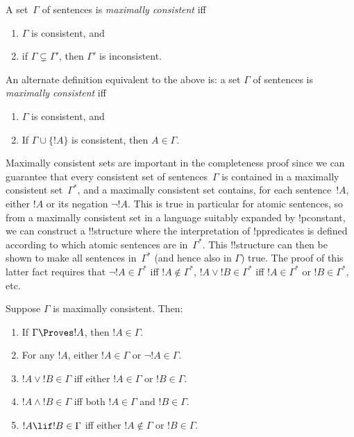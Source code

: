 \documentclass[../../include/open-logic-section]{subfiles}
\begin{document}

\begin{defn}
A set~$\Gamma$ of sentences is \emph{maximally consistent} iff
\begin{enumerate}
\item $\Gamma$ is consistent, and
\item if $\Gamma \subsetneq \Gamma'$, then $\Gamma'$ is inconsistent.
\end{enumerate}
\end{defn}

\begin{digress}
An alternate definition equivalent to the above is: a set $\Gamma$ of
sentences is \emph{maximally consistent} iff
\begin{enumerate}
\item $\Gamma$ is consistent, and
\item If $\Gamma \cup \{ !A \}$ is consistent, then $A \in \Gamma$.
\end{enumerate}
\end{digress}

\begin{explain}
Maximally consistent sets are important in the completeness proof
since we can guarantee that every consistent set of sentences~$\Gamma$
is contained in a maximally consistent set~$\Gamma^*$, and a maximally
consistent set contains, for each sentence~$!A$, either $!A$ or its
negation $\lnot !A$.  This is true in particular for atomic sentences,
so from a maximally consistent set in a language suitably expanded by
!p{constant}, we can construct a !!{structure} where the
interpretation of !p{predicates} is defined according to which atomic
sentences are in~$\Gamma^*$. This !!{structure} can then be shown to
make all sentences in~$\Gamma^*$ (and hence also in $\Gamma$)
true. The proof of this latter fact requires that $\lnot !A \in
\Gamma^*$ iff $!A \notin \Gamma^*$, $!A \lor !B \in \Gamma^*$ iff $!A
\in \Gamma^*$ or $!B \in \Gamma^*$, etc.
\end{explain}

\begin{prop}
Suppose $\Gamma$ is maximally consistent. Then:
\begin{enumerate}
\item {} If $\Gamma \Proves !A$, then $!A \in
  \Gamma$.
\item {} For any $!A$, either $!A \in
  \Gamma$ or $\lnot !A \in \Gamma$.
\item $!A \lor !B \in \Gamma$ iff either $!A \in \Gamma$ or $!B \in
  \Gamma$.
\item $!A \land !B \in \Gamma$ iff both $!A \in \Gamma$ and $!B \in
  \Gamma$.
\item $!A \lif !B \in \Gamma$ iff either $!A \notin \Gamma$ or $!B \in
  \Gamma$.
\end{enumerate}
\end{prop}
\end{document}
